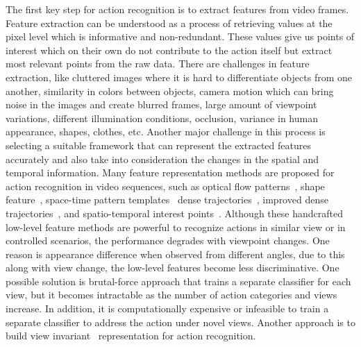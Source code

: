 The first key step for action recognition is to extract features from video frames. Feature extraction can be understood as a process of retrieving values at the pixel level which is informative and non-redundant. These values give us points of interest which on their own do not contribute to the action itself but extract most relevant points from the raw data. There are challenges in feature extraction, like cluttered images where it is hard to differentiate objects from one another, similarity in colors between objects, camera motion which can bring noise in the images and create blurred frames, large amount of viewpoint variations, different illumination conditions, occlusion, variance in human appearance, shapes, clothes, etc. Another major challenge in this process is selecting a suitable framework that can represent the extracted features accurately and also take into consideration the changes in the spatial and temporal information.
Many feature representation methods are proposed for action recognition in video sequences, such as optical flow patterns~\cite{Efros:2003:RAD:946247.946720,1315182}, shape feature~\cite{4270156,5459184,1211340,4587527}, space-time pattern templates~\cite{1467373,1544882} dense trajectories~\cite{wang2013dense}, improved dense trajectories~\cite{wang2013action}, and spatio-temporal interest points~\cite{1238378}. Although these handcrafted low-level feature methods are powerful to recognize actions in similar view or in controlled scenarios, the performance degrades with viewpoint changes. One reason is appearance difference when observed from different angles, due to this along with view change, the low-level features become less discriminative. One possible solution is brutal-force approach that trains a separate classifier for each view, but it becomes intractable as the number of action categories and views increase. In addition, it is computationally expensive or infeasible to train a separate classifier to address the action under novel views. Another approach is to build view invariant~\cite{10.1007/978-3-540-88688-4_22,6939719,zheng2016cross,zheng2013learning, 7045574, 7907301,6958807} representation for action recognition. 

